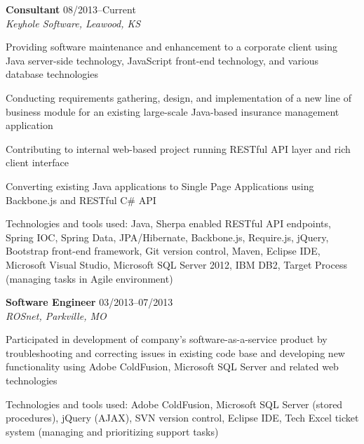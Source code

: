 \begin{itemize1}
	\item \textbf{Consultant} \textopenbullet{} 08/2013--Current \\
		\textit{Keyhole Software, Leawood, KS} \vspace{-1.5mm}
		\begin{itemize1}
			\item Providing software maintenance and enhancement to a corporate client using Java server-side technology, JavaScript front-end technology, and various database technologies
			\item Conducting requirements gathering, design, and implementation of a new line of business module for an existing large-scale Java-based insurance management application
			\item Contributing to internal web-based project running RESTful API layer and rich client interface
			\item Converting existing Java applications to Single Page Applications using Backbone.js and RESTful C\# API
			\item Technologies and tools used: Java, Sherpa enabled RESTful API endpoints, Spring IOC, Spring Data, JPA/Hibernate, Backbone.js, Require.js, jQuery, Bootstrap front-end framework, Git version control, Maven, Eclipse IDE, Microsoft Visual Studio, Microsoft SQL Server 2012, IBM DB2, Target Process (managing tasks in Agile environment)
		\end{itemize1}
\end{itemize1}

\begin{itemize1}
	\item \textbf{Software Engineer} \textopenbullet{} 03/2013--07/2013 \\
		\textit{ROSnet, Parkville, MO} \vspace{-1.5mm}
		\begin{itemize1}
			\item Participated in development of company's software-as-a-service product by troubleshooting and correcting issues in existing code base and developing new functionality using Adobe ColdFusion, Microsoft SQL Server and related web technologies
			\item Technologies and tools used: Adobe ColdFusion, Microsoft SQL Server (stored procedures), jQuery (AJAX), SVN version control, Eclipse IDE, Tech Excel ticket system (managing and prioritizing support tasks)
		\end{itemize1}
\end{itemize1}

